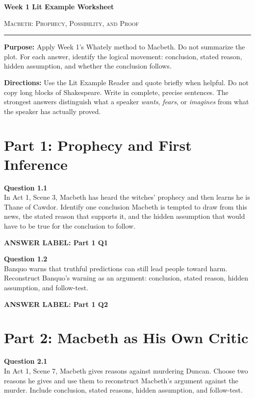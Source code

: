 \documentclass[12pt]{article}
\newcommand{\answerbox}[2]{%
\vspace{0.12em}
\noindent\textbf{#1}\par
\vspace{0.04em}
\noindent\fbox{%
\begin{minipage}[t][#2]{\dimexpr\textwidth-2\fboxsep-2\fboxrule}
\rule{\textwidth}{0pt}
\vspace{#2}
\end{minipage}}
\par\vspace{0.22em}}
\begin{document}
\begin{center}
{\LARGE\bfseries Week 1 Lit Example Worksheet}\par\vspace{0.05em}
{\large\scshape Macbeth: Prophecy, Possibility, and Proof}\par\vspace{0.12em}
\rule{0.78\textwidth}{0.5pt}
\end{center}

\textbf{Purpose:} Apply Week 1's Whately method to Macbeth. Do not summarize the plot. For each answer, identify the logical movement: conclusion, stated reason, hidden assumption, and whether the conclusion follows.

\textbf{Directions:} Use the Lit Example Reader and quote briefly when helpful. Do not copy long blocks of Shakespeare. Write in complete, precise sentences. The strongest answers distinguish what a speaker \textit{wants}, \textit{fears}, or \textit{imagines} from what the speaker has actually proved.

\section*{Part 1: Prophecy and First Inference}

\textbf{Question 1.1}\\[-0.15em]
In Act 1, Scene 3, Macbeth has heard the witches' prophecy and then learns he is Thane of Cawdor. Identify one conclusion Macbeth is tempted to draw from this news, the stated reason that supports it, and the hidden assumption that would have to be true for the conclusion to follow.

\answerbox{ANSWER LABEL: Part 1 Q1}{2.15in}

\textbf{Question 1.2}\\[-0.15em]
Banquo warns that truthful predictions can still lead people toward harm. Reconstruct Banquo's warning as an argument: conclusion, stated reason, hidden assumption, and follow-test.

\answerbox{ANSWER LABEL: Part 1 Q2}{2.15in}

\newpage

\section*{Part 2: Macbeth as His Own Critic}

\textbf{Question 2.1}\\[-0.15em]
In Act 1, Scene 7, Macbeth gives reasons against murdering Duncan. Choose two reasons he gives and use them to reconstruct Macbeth's argument against the murder. Include conclusion, stated reasons, hidden assumption, and follow-test.
\end{document}
